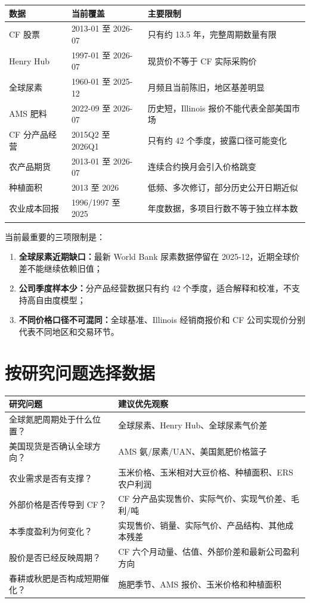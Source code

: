 \documentclass[11pt,a4paper]{ctexart}
\begin{document}
\begin{center}
\small
\begin{tabularx}{\textwidth}{L{3.1cm}L{3.2cm}Y}
\toprule
数据 & 当前覆盖 & 主要限制 \\
\midrule
CF 股票 & 2013-01 至 2026-07 & 只有约 13.5 年，完整周期数量有限 \\
Henry Hub & 1997-01 至 2026-07 & 现货价不等于 CF 实际采购价 \\
全球尿素 & 1960-01 至 2025-12 & 月频且当前陈旧，地区基差明显 \\
AMS 肥料 & 2022-09 至 2026-07 & 历史短，Illinois 报价不能代表全部美国市场 \\
CF 分产品经营 & 2015Q2 至 2026Q1 & 只有约 42 个季度，披露口径可能变化 \\
农产品期货 & 2013-01 至 2026-07 & 连续合约换月会引入价格跳变 \\
种植面积 & 2013 至 2026 & 低频、多次修订，部分历史公开日期近似 \\
农业成本回报 & 1996/1997 至 2025 & 年度数据，多项目行数不等于独立样本数 \\
\bottomrule
\end{tabularx}
\normalsize
\end{center}

当前最重要的三项限制是：

\begin{enumerate}
  \item \textbf{全球尿素近期缺口：}最新 World Bank 尿素数据停留在 2025-12，近期全球价差不能继续依赖旧值；
  \item \textbf{公司季度样本少：}分产品经营数据只有约 42 个季度，适合解释和校准，不支持高自由度模型；
  \item \textbf{不同价格口径不可混同：}全球基准、Illinois 经销商报价和 CF 公司实现价分别代表不同地区和交易环节。
\end{enumerate}

\section{按研究问题选择数据}

\begin{center}
\small
\begin{tabularx}{\textwidth}{L{4.1cm}Y}
\toprule
研究问题 & 建议优先观察 \\
\midrule
全球氮肥周期处于什么位置？ & 全球尿素、Henry Hub、全球尿素气价差 \\
美国现货是否确认全球方向？ & AMS 氨/尿素/UAN、美国氮肥价格篮子 \\
农业需求是否有支撑？ & 玉米价格、玉米相对大豆价格、种植面积、ERS 农户利润 \\
外部价格是否传导到 CF？ & CF 分产品实现售价、实际气价、实现气价差、毛利/吨 \\
本季度盈利为何变化？ & 实现售价、销量、实际气价、产品结构、其他成本残差 \\
股价是否已经反映周期？ & CF 六个月动量、估值、外部价差和最新公司盈利方向 \\
春耕或秋肥是否构成短期催化？ & 施肥季节、AMS 报价、玉米价格和种植面积 \\
\bottomrule
\end{tabularx}
\normalsize
\end{center}
\end{document}
